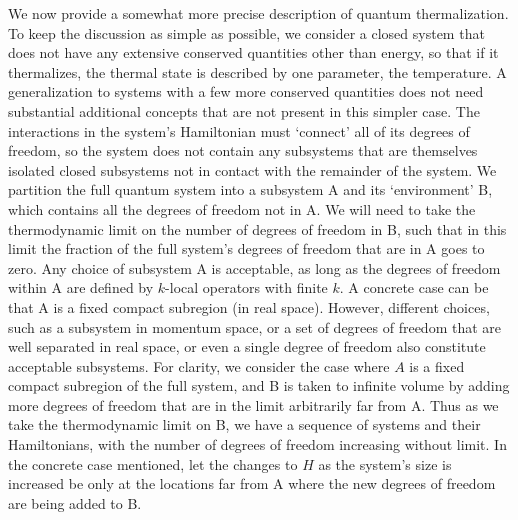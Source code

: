 \documentclass[amsmath,onecolumn, superscriptaddress,preprint,aps]{revtex4}
\begin{document}
We now provide a somewhat more precise description of quantum thermalization.  To keep the discussion as simple as possible, we consider a closed system that does not have any extensive conserved quantities other than energy, so that if it thermalizes, the thermal state is described by one parameter, the temperature.  A generalization to systems with a few more conserved quantities does not need substantial additional concepts that are not present in this simpler case.  The interactions in the system's Hamiltonian must `connect' all of its degrees of freedom, so the system does not contain any subsystems that are themselves isolated closed subsystems not in contact with the remainder of the system.
We partition the full quantum system into a subsystem A and its `environment' B,
which contains all the degrees of freedom not in A.  We will need to take the thermodynamic limit on the number of degrees of freedom in B,
such that in this limit the fraction of the full system's degrees of freedom that are in A goes to zero.
Any choice of subsystem A is acceptable, as long as the degrees of freedom within A are defined by $k$-local operators with finite $k$.
A concrete case can be that A is a fixed compact subregion (in real space).  However, different choices, such as a subsystem in momentum space, or a set of degrees of freedom that are well separated in real space, or even a single degree of freedom also constitute acceptable subsystems. For clarity, we consider the case where $A$ is a fixed compact subregion of the full system, and B is taken to infinite volume by adding more degrees of
freedom that are in the limit arbitrarily far from A. Thus as we take the thermodynamic limit on B, we have a sequence of systems and their Hamiltonians, with the number of degrees of freedom increasing without limit.  In the concrete case mentioned, let the changes to $H$ as the system's size is increased be only at the locations far from A where the new degrees of freedom are being added to B.
\end{document}
